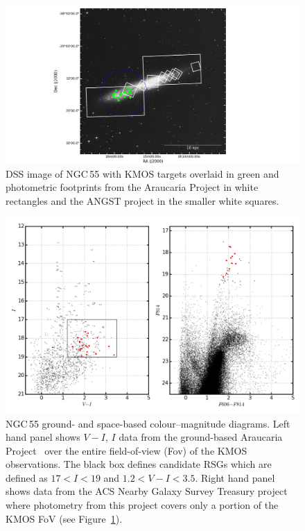 \begin{figure}
 \centering
 \includegraphics[width=\textwidth]{ngc55/ngc55_fields-v3}
 \caption[DSS image of NGC\,55 with KMOS and photometric footprints highlighted]{
          DSS image of NGC\,55 with KMOS targets overlaid in green and photometric footprints from the Araucaria Project
          \protect\citep{2005Msngr.121...23G} in white rectangles
          and the ANGST project
          \protect\citep{2009ApJS..183...67D} in the smaller white squares.
         }
 \label{fig:ngc55-foot}
\end{figure}


\begin{figure}
  \centering
  \includegraphics[width=\textwidth]{ngc55/ngc55-v_i_both}
 \caption[NGC\,55 ground- and space-based colour--magnitude diagrams]{
  NGC\,55 ground- and space-based colour--magnitude diagrams. Left hand panel shows $V-I$, $I$ data from the ground-based Araucaria Project~\cite{2005Msngr.121...23G}
  over the entire field-of-view (Fov) of the KMOS observations.
  The black box defines candidate RSGs which are defined as
  $17 < I < 19$ and $1.2 < V-I < 3.5$.
  Right hand panel shows data from the ACS Nearby Galaxy Survey Treasury
  \citep[ANGST][]{2009ApJS..183...67D} project where photometry from this project covers only a portion of the KMOS FoV (see Figure~\ref{fig:ngc55-foot}).
          }
 \label{fig:VI}
\end{figure}


